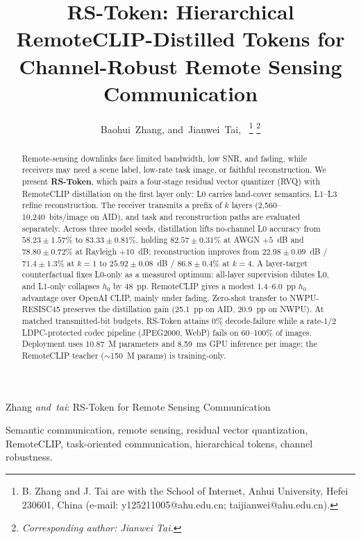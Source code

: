 \documentclass[lettersize,journal]{IEEEtran}
\begin{document}
\title{RS-Token: Hierarchical RemoteCLIP-Distilled Tokens for Channel-Robust Remote Sensing Communication}

\author{Baohui~Zhang,
        and~Jianwei~Tai,~%
\thanks{B. Zhang and J. Tai are with the School of Internet, Anhui University, Hefei 230601, China (e-mail: y125211005@ahu.edu.cn; taijianwei@ahu.edu.cn).}%
\thanks{\textit{Corresponding author: Jianwei Tai.}}%
}

%
{Zhang \MakeLowercase{\textit{and~Tai}}: RS-Token for Remote Sensing Communication}

\maketitle

\begin{abstract}
Remote-sensing downlinks face limited bandwidth, low SNR, and fading, while receivers may need a scene label, low-rate task image, or faithful reconstruction. We present \textbf{RS-Token}, which pairs a four-stage residual vector quantizer (RVQ) with RemoteCLIP distillation on the first layer only: L0 carries land-cover semantics, L1--L3 refine reconstruction. The receiver transmits a prefix of $k$ layers (2{,}560--10{,}240~bits/image on AID), and task and reconstruction paths are evaluated separately. Across three model seeds, distillation lifts no-channel L0 accuracy from $58.23\pm1.57\%$ to $83.33\pm0.81\%$, holding $82.57\pm0.31\%$ at AWGN $+5$~dB and $78.80\pm0.72\%$ at Rayleigh $+10$~dB; reconstruction improves from $22.98\pm0.09$~dB / $71.4\pm1.3\%$ at $k=1$ to $25.92\pm0.08$~dB / $86.8\pm0.4\%$ at $k=4$. A layer-target counterfactual fixes L0-only as a measured optimum: all-layer supervision dilutes L0, and L1-only collapses $h_0$ by 48~pp. RemoteCLIP gives a modest 1.4--6.0~pp $h_0$ advantage over OpenAI CLIP, mainly under fading. Zero-shot transfer to NWPU-RESISC45 preserves the distillation gain (25.1~pp on AID, 20.9~pp on NWPU). At matched transmitted-bit budgets, RS-Token attains $0\%$ decode-failure while a rate-1/2 LDPC-protected codec pipeline (JPEG2000, WebP) fails on 60--100\% of images. Deployment uses 10.87~M parameters and 8.59~ms GPU inference per image; the RemoteCLIP teacher ($\sim$150~M params) is training-only.
\end{abstract}

\begin{IEEEkeywords}
Semantic communication, remote sensing, residual vector quantization, RemoteCLIP, task-oriented communication, hierarchical tokens, channel robustness.
\end{IEEEkeywords}
\end{document}
